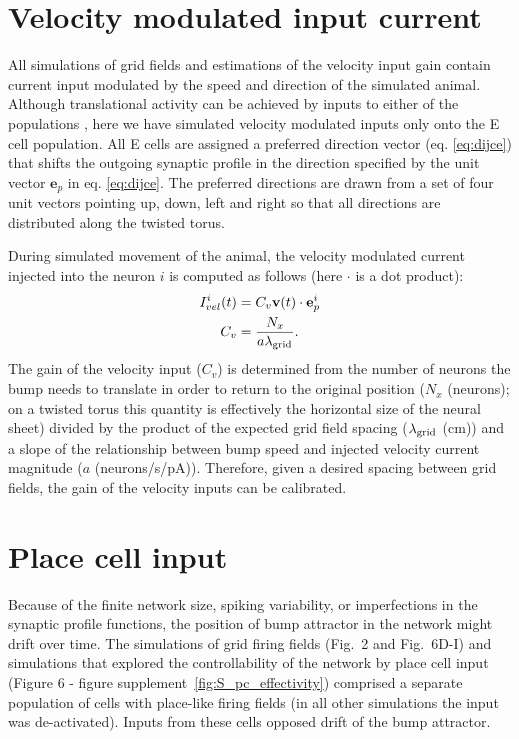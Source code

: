 \documentclass[a4paper,12pt]{article}
\newcommand{\ssc}[3]{\ensuremath{#1_{\text{#2}_{\text{#3}}}}}
\newcommand{\lamgrid}{\ssc{\lambda}{\scriptsize{grid}}{}}
\begin{document}


\section{Velocity modulated input current } \label{sec:Ivel}

All simulations of grid fields and estimations of the velocity input gain
contain current input modulated by the speed and direction of the simulated
animal. Although translational activity can be achieved by inputs to either of
the populations \citep{Pastoll:2013ff}, here we have simulated velocity
modulated inputs only onto the E cell population. All E cells are assigned a
preferred direction vector (eq. \ref{eq:dijce}) that shifts the outgoing
synaptic profile in the direction specified by the unit vector $\mathbf{e}_p$
in eq. \eqref{eq:dijce}. The preferred directions are drawn from a set of four
unit vectors pointing up, down, left and right so that all directions are
distributed along the twisted torus.

During simulated movement of the animal, the velocity modulated current
injected into the neuron $i$ is computed as follows (here $\cdot$ is a dot
product):
\begin{eqnarray}
    I_{vel}^i(t) &= C_v \mathbf{v}(t) \cdot \mathbf{e}_p^i \notag \\
    C_v          &= \frac{N_x}{a\lamgrid}.
\end{eqnarray}
The gain of the velocity input ($C_v$) is determined from the number of neurons
the bump needs to translate in order to return to the original position
($N_x$ (neurons); on a twisted torus this quantity is effectively the horizontal size of
the neural sheet) divided by the product of the expected grid field spacing
($\lamgrid$ (cm)) and a slope of the relationship between bump speed and injected
velocity current magnitude ($a$ (neurons/s/pA)). Therefore, given a desired
spacing between grid fields, the gain of the velocity inputs can be calibrated.


\section{Place cell input} \label{sec:place_cells}

Because of the finite network size, spiking variability, or imperfections in
the synaptic profile functions, the position of bump attractor in the network
might drift over time. The simulations of grid firing fields (Fig.~2 and
Fig.~6D-I) and simulations that explored the controllability of the network by
place cell input (Figure 6 - figure supplement~\ref{fig:S_pc_effectivity})
comprised a separate population of cells with place-like firing fields (in all
other simulations the input was de-activated). Inputs from these cells opposed
drift of the bump attractor.
\end{document}
